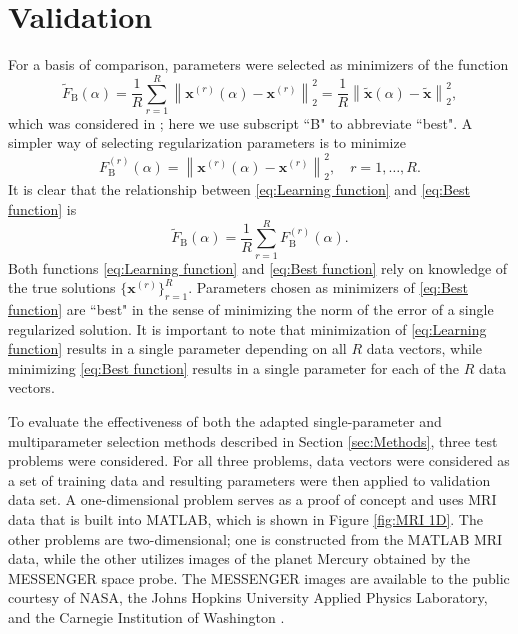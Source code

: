 \documentclass[12pt]{article}
\newcommand{\xVec}{\mathbf{x}}	%
\newcommand{\regparam}{\alpha}  %
\newcommand{\xBig}{\widetilde{\xVec}}	%
\begin{document}
\section{Validation} \label{sec:Validation}
For a basis of comparison, parameters were selected as minimizers of the function
\begin{equation}
\label{eq:Learning function}
\widetilde{F}_{\text{B}}(\regparam) = \frac{1}{R}\sum_{r=1}^R \left\|\xVec^{(r)}(\regparam) - \xVec^{(r)}\right\|_2^2 = \frac{1}{R}\left\|\xBig(\regparam) - \xBig\right\|_2^2,
\end{equation} 
which was considered in \cite{ChungEspanol2017}; here we use subscript ``B" to abbreviate ``best". A simpler way of selecting regularization parameters is to minimize
\begin{equation}
\label{eq:Best function}
F_{\text{B}}^{(r)}(\regparam) = \left\|\xVec^{(r)}(\regparam) - \xVec^{(r)}\right\|_2^2, \quad r = 1,\ldots,R.
\end{equation}
It is clear that the relationship between \eqref{eq:Learning function} and \eqref{eq:Best function} is
\[\widetilde{F}_{\text{B}}(\regparam) = \frac{1}{R}\sum_{r=1}^R F_{\text{B}}^{(r)}(\regparam).\]
Both functions \eqref{eq:Learning function} and \eqref{eq:Best function} rely on knowledge of the true solutions $\{\xVec^{(r)}\}_{r=1}^R$. Parameters chosen as minimizers of \eqref{eq:Best function} are ``best" in the sense of minimizing the norm of the error of a single regularized solution. It is important to note that minimization of \eqref{eq:Learning function} results in a single parameter depending on all $R$ data vectors, while minimizing \eqref{eq:Best function} results in a single parameter for each of the $R$ data vectors. \par
To evaluate the effectiveness of both the adapted single-parameter and multiparameter selection methods described in Section \ref{sec:Methods}, three test problems were considered. For all three problems, data vectors were considered as a set of training data and resulting parameters were then applied to validation data set. A one-dimensional problem serves as a proof of concept and uses MRI data that is built into MATLAB, which is shown in Figure \ref{fig:MRI 1D}. The other problems are two-dimensional; one is constructed from the MATLAB MRI data, while the other utilizes images of the planet Mercury obtained by the MESSENGER space probe. The MESSENGER images are available to the public courtesy of NASA, the Johns Hopkins University Applied Physics Laboratory, and the Carnegie Institution of Washington \cite{MESSENGER}. \par
\end{document}
